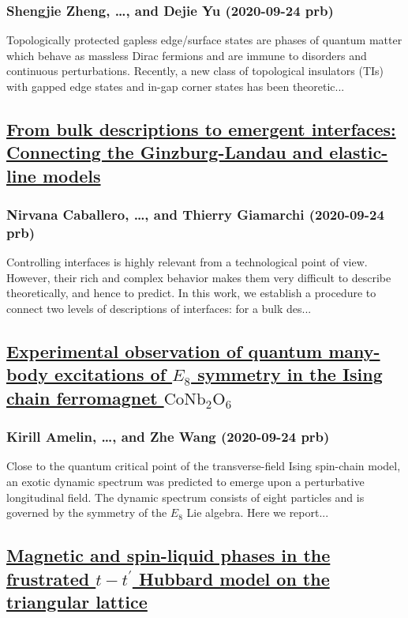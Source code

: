 \subsubsection*{Shengjie Zheng, \dots, and Dejie Yu (2020-09-24 prb)}
Topologically protected gapless edge/surface states are phases of quantum matter which behave as massless Dirac fermions and are immune to disorders and continuous perturbations. Recently, a new class of topological insulators (TIs) with gapped edge states and in-gap corner states has been theoretic...
\subsection*{\href{http://link.aps.org/doi/10.1103/PhysRevB.102.104204}{From bulk descriptions to emergent interfaces: Connecting the Ginzburg-Landau and elastic-line models}}
\subsubsection*{Nirvana Caballero, \dots, and Thierry Giamarchi (2020-09-24 prb)}
Controlling interfaces is highly relevant from a technological point of view. However, their rich and complex behavior makes them very difficult to describe theoretically, and hence to predict. In this work, we establish a procedure to connect two levels of descriptions of interfaces: for a bulk des...
\subsection*{\href{http://link.aps.org/doi/10.1103/PhysRevB.102.104431}{Experimental observation of quantum many-body excitations of ${E}_{8}$ symmetry in the Ising chain ferromagnet ${\mathrm{CoNb}}_{2}{\mathrm{O}}_{6}$}}
\subsubsection*{Kirill Amelin, \dots, and Zhe Wang (2020-09-24 prb)}
Close to the quantum critical point of the transverse-field Ising spin-chain model, an exotic dynamic spectrum was predicted to emerge upon a perturbative longitudinal field. The dynamic spectrum consists of eight particles and is governed by the symmetry of the ${E}_{8}$ Lie algebra. Here we report...
\subsection*{\href{http://link.aps.org/doi/10.1103/PhysRevB.102.115150}{Magnetic and spin-liquid phases in the frustrated $t−{t}^{′}$ Hubbard model on the triangular lattice}}

